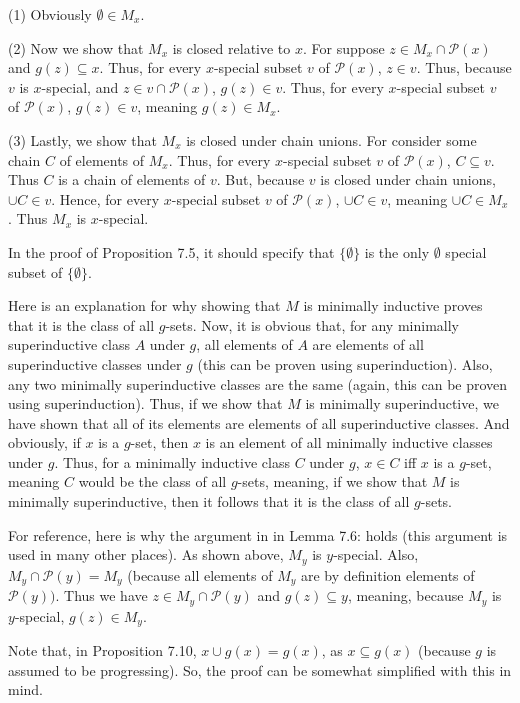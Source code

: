 \documentclass{article}
\theoremstyle{definition}
\begin{document}
(1) Obviously $\emptyset\in M_x$.\newline

(2) Now we show that $M_x$ is closed relative to $x$. For suppose $z\in M_x\cap\mathcal{P}(x)$ and $g(z)\subseteq x$. Thus, for every 
$x$-special subset $v$ of $\mathcal{P}(x)$, $z\in v$. Thus, because $v$ is $x$-special, and $z\in v\cap\mathcal{P}(x)$, 
$g(z)\in v$. Thus, for every $x$-special subset $v$ of $\mathcal{P}(x)$, $g(z)\in v$, meaning $g(z)\in M_x$.\newline

(3) Lastly, we show that $M_x$ is closed under chain unions. For consider some chain $C$ of elements of $M_x$. Thus, for 
every $x$-special subset $v$ of $\mathcal{P}(x)$, $C\subseteq v$. Thus $C$ is a chain of elements of $v$. But, because 
$v$ is closed under chain unions, $\cup C\in v$. Hence, for every $x$-special subset $v$ of $\mathcal{P}(x)$, 
$\cup C\in v$, meaning $\cup C\in M_x$. Thus $M_x$ is $x$-special. 

In the proof of Proposition 7.5, it should specify that $\{\emptyset\}$ is the only $\emptyset$ special subset of 
$\{\emptyset\}$. 

Here is an explanation for why showing that $M$ is minimally inductive proves that it is the class of all $g$-sets.
Now, it is obvious that, for any minimally superinductive class $A$ under $g$, all elements of $A$ are elements of 
all superinductive classes under $g$ (this can be proven using superinduction). Also, any two minimally superinductive 
classes are the same (again, this can be proven using superinduction). Thus, if we show that $M$ is minimally superinductive, 
we have shown that all of its elements are elements of all superinductive classes. And obviously, if $x$ is a $g$-set, 
then $x$ is an element of all minimally inductive classes under $g$. Thus, for a minimally inductive class $C$ under $g$, 
$x\in C$ iff $x$ is a $g$-set, meaning $C$ would be the class of all $g$-sets, meaning, if we show that $M$ is minimally 
superinductive, then it follows that it is the class of all $g$-sets.

For reference, here is why the argument in in Lemma 7.6:  holds (this argument is used in many other places). As shown 
above, $M_y$ is $y$-special. Also, $M_y\cap\mathcal{P}(y)=M_y$ (because all elements of $M_y$ are by definition 
elements of $\mathcal{P}(y))$. Thus we have $z\in M_y\cap\mathcal{P}(y)$ and 
$g(z)\subseteq y$, meaning, because $M_y$ is $y$-special, $g(z)\in M_y$.

Note that, in Proposition 7.10, $x\cup g(x)=g(x)$, as $x\subseteq g(x)$ (because $g$ is assumed to be progressing). So, the proof 
can be somewhat simplified with this in mind.
\end{document}
